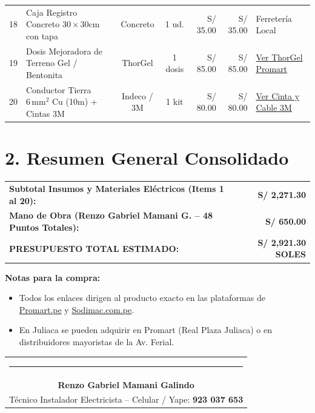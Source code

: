 \documentclass[11pt,a4paper]{article}
\begin{document}
\begin{table}[H]
\begin{tabularx}{\textwidth}{c X c c r r X}
18 & Caja Registro Concreto $30 \times 30\text{cm}$ con tapa & Concreto & 1 ud. & S/ 35.00 & S/ 35.00 & Ferretería Local \\
19 & Dosis Mejoradora de Terreno Gel / Bentonita & ThorGel & 1 dosis & S/ 85.00 & S/ 85.00 & \href{https://www.promart.pe/dosis-thorgel-para-pozo-a-tierra-40291/p}{Ver ThorGel Promart} \\
20 & Conductor Tierra $6\,\text{mm}^2$ Cu (10m) + Cintas 3M & Indeco / 3M & 1 kit & S/ 80.00 & S/ 80.00 & \href{https://www.sodimac.com.pe/sodimac-pe/product/2084725/cable-6mm2-verde/2084725}{Ver Cinta y Cable 3M} \\
\bottomrule
\end{tabularx}
\end{table}

\section*{2. Resumen General Consolidado}

\begin{tcolorbox}[colback=BgGrey,colframe=DarkBlue,title=\textbf{PRESUPUESTO GENERAL FINAL (MATERIALES + MANO DE OBRA)}]
    \begin{tabularx}{\textwidth}{X r}
        \textbf{Subtotal Insumos y Materiales Eléctricos (Items 1 al 20):} & \textbf{S/ 2,271.30} \\
        \textbf{Mano de Obra (Renzo Gabriel Mamani G. -- 48 Puntos Totales):} & \textbf{S/ 650.00} \\
        \midrule
        {\Large \textbf{\color{DarkBlue} PRESUPUESTO TOTAL ESTIMADO:}} & {\Huge \textbf{\color{GreenPrice} S/ 2,921.30 SOLES}} \\
    \end{tabularx}
    \tcblower
    \small \textbf{Notas para la compra:}
    \begin{itemize}
        \item Todos los enlaces dirigen al producto exacto en las plataformas de \href{https://www.promart.pe}{Promart.pe} y \href{https://www.sodimac.com.pe}{Sodimac.com.pe}.
        \item En Juliaca se pueden adquirir en Promart (Real Plaza Juliaca) o en distribuidores mayoristas de la Av. Ferial.
    \end{itemize}
\end{tcolorbox}

\vspace{0.6cm}

\begin{table}[H]
\centering
\begin{tabular}{c}
    \rule{7cm}{0.4pt} \\
    \textbf{Renzo Gabriel Mamani Galindo} \\
    Técnico Instalador Electricista -- Celular / Yape: \textbf{923 037 653}
\end{tabular}
\end{table}
\end{document}
